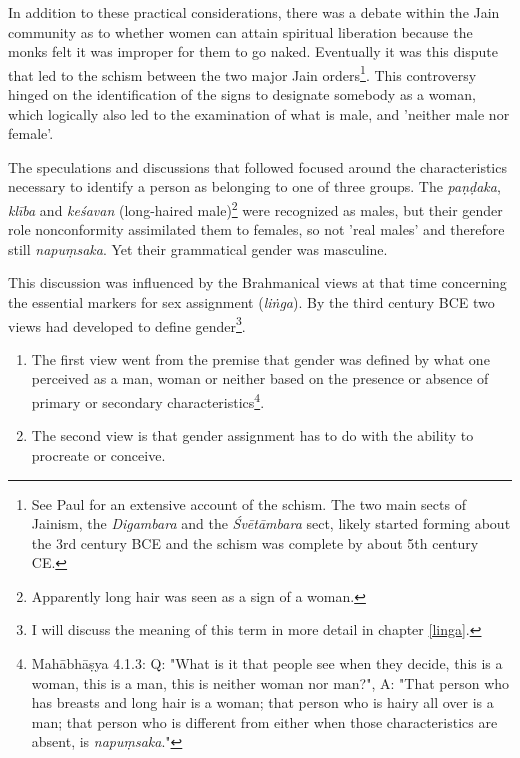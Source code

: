 In addition to these practical considerations, there was a debate within the Jain community as to whether women can attain spiritual liberation because the monks felt it was improper for them to go naked. Eventually it was this dispute that led to the schism between the two major Jain orders\footnote{See Paul \cite{dudas} for an extensive account of the schism. The two main sects of Jainism, the {\em Digambara} and the {\em Śvētāmbara} sect, likely started forming about the 3rd century BCE and the schism was complete by about 5th century CE.}. This controversy hinged on the identification of the signs to designate somebody as a woman, which logically also led to the examination of what is male, and 'neither male nor female'. 

The speculations and discussions that followed focused around the characteristics necessary to identify a person as belonging to one of three groups. The {\em paṇḍaka}, {\em klība} and {\em keśavan} (long-haired male)\footnote{Apparently long hair was seen as a sign of a woman.} were recognized as males, but their gender role nonconformity assimilated them to females, so not 'real males' and therefore still {\em napuṃsaka}. Yet their grammatical gender was masculine.

This discussion was influenced by the Brahmanical views at that time concerning the essential markers for sex assignment ({\em liṅga}). By the third century BCE two views had developed to define gender\footnote{I will discuss the meaning of this term in more detail in chapter \ref{linga}.}.
\begin{enumerate}
 \item The first view went from the premise that gender was defined by what one perceived as a man, woman or neither based on the presence or absence of primary or secondary characteristics\footnote{Mahābhāṣya 4.1.3: Q: "What is it that people see when they decide, this is a woman, this is a man, this is neither woman nor man?", A: "That person who has breasts and long hair is a woman; that person who is hairy all over is a man; that person who is different from either when those characteristics are absent, is {\em napuṃsaka}."}.
 \item The second view is that gender assignment has to do with the ability to procreate or conceive. 
\end{enumerate}

